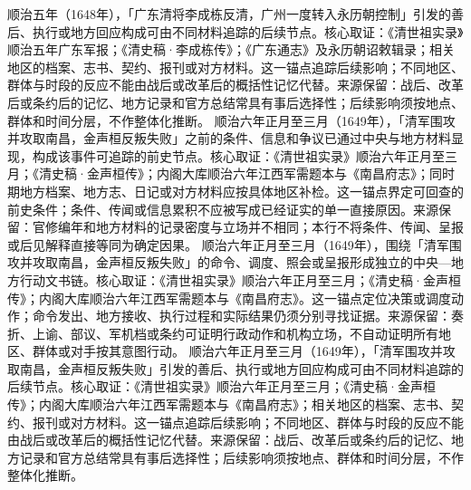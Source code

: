 顺治五年（1648年），「广东清将李成栋反清，广州一度转入永历朝控制」引发的善后、执行或地方回应构成可由不同材料追踪的后续节点。核心取证：《清世祖实录》顺治五年广东军报；《清史稿·李成栋传》；《广东通志》及永历朝诏敕辑录；相关地区的档案、志书、契约、报刊或对方材料。这一锚点追踪后续影响；不同地区、群体与时段的反应不能由战后或改革后的概括性记忆代替。来源保留：战后、改革后或条约后的记忆、地方记录和官方总结常具有事后选择性；后续影响须按地点、群体和时间分层，不作整体化推断。
顺治六年正月至三月（1649年），「清军围攻并攻取南昌，金声桓反叛失败」之前的条件、信息和争议已通过中央与地方材料显现，构成该事件可追踪的前史节点。核心取证：《清世祖实录》顺治六年正月至三月；《清史稿·金声桓传》；内阁大库顺治六年江西军需题本与《南昌府志》；同时期地方档案、地方志、日记或对方材料应按具体地区补检。这一锚点界定可回查的前史条件；条件、传闻或信息累积不应被写成已经证实的单一直接原因。来源保留：官修编年和地方材料的记录密度与立场并不相同；本行不将条件、传闻、呈报或后见解释直接等同为确定因果。
顺治六年正月至三月（1649年），围绕「清军围攻并攻取南昌，金声桓反叛失败」的命令、调度、照会或呈报形成独立的中央—地方行动文书链。核心取证：《清世祖实录》顺治六年正月至三月；《清史稿·金声桓传》；内阁大库顺治六年江西军需题本与《南昌府志》。这一锚点定位决策或调度动作；命令发出、地方接收、执行过程和实际结果仍须分别寻找证据。来源保留：奏折、上谕、部议、军机档或条约可证明行政动作和机构立场，不自动证明所有地区、群体或对手按其意图行动。
顺治六年正月至三月（1649年），「清军围攻并攻取南昌，金声桓反叛失败」引发的善后、执行或地方回应构成可由不同材料追踪的后续节点。核心取证：《清世祖实录》顺治六年正月至三月；《清史稿·金声桓传》；内阁大库顺治六年江西军需题本与《南昌府志》；相关地区的档案、志书、契约、报刊或对方材料。这一锚点追踪后续影响；不同地区、群体与时段的反应不能由战后或改革后的概括性记忆代替。来源保留：战后、改革后或条约后的记忆、地方记录和官方总结常具有事后选择性；后续影响须按地点、群体和时间分层，不作整体化推断。
